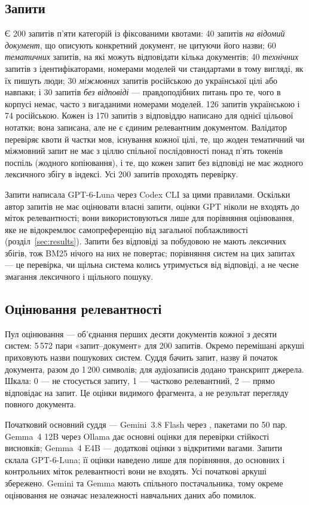 \subsection{Запити}
Є 200 запитів п'яти категорій із фіксованими квотами: 40 запитів \emph{на відомий документ}, що описують конкретний документ, не цитуючи його назви; 60 \emph{тематичних} запитів, на які можуть відповідати кілька документів; 40 \emph{технічних} запитів з ідентифікаторами, номерами моделей чи стандартами в тому вигляді, як їх пишуть люди; 30 \emph{міжмовних} запитів російською до української цілі або навпаки; і 30 запитів \emph{без відповіді} --- правдоподібних питань про те, чого в корпусі немає, часто з вигаданими номерами моделей. 126 запитів українською і 74 російською. Кожен із 170 запитів з відповіддю написано для однієї цільової нотатки; вона записана, але не є єдиним релевантним документом. Валідатор перевіряє квоти й частки мов, існування кожної цілі, те, що жоден тематичний чи міжмовний запит не має з ціллю спільної послідовності понад п'ять токенів поспіль (жодного копіювання), і те, що кожен запит без відповіді не має жодного лексичного збігу в індексі. Усі 200 запитів проходять перевірку.

Запити написала GPT-6-Luna через Codex CLI за цими правилами. Оскільки автор запитів не має оцінювати власні запити, оцінки GPT ніколи не входять до міток релевантності; вони використовуються лише для порівняння оцінювання, яке не відокремлює самопреференцію від загальної поблажливості (розділ~\ref{sec:results}). Запити без відповіді за побудовою не мають лексичних збігів, тож BM25 нічого на них не повертає; порівняння систем на цих запитах --- це перевірка, чи щільна система колись утримується від відповіді, а не чесне змагання лексичного і щільного пошуку.

\subsection{Оцінювання релевантності}
Пул оцінювання — об'єднання перших десяти документів кожної з десяти систем: 5\,572 пари «запит--документ» для 200 запитів. Окремо перемішані аркуші приховують назви пошукових систем. Суддя бачить запит, назву й початок документа, разом до 1\,200 символів; для аудіозаписів додано транскрипт джерела. Шкала: 0 — не стосується запиту, 1 — частково релевантний, 2 — прямо відповідає на запит. Це оцінки видимого фрагмента, а не результат перегляду повного документа.

Початковий основний суддя — Gemini~3.8 Flash через , пакетами по 50 пар. Gemma~4 12B через Ollama дає основні оцінки для перевірки стійкості висновків; Gemma~4 E4B — додаткові оцінки з відкритими вагами. Запити склала GPT-6-Luna; її оцінки наведено лише для порівняння, до основних і контрольних міток релевантності вони не входять. Усі початкові аркуші збережено. Gemini та Gemma мають спільного постачальника, тому окреме оцінювання не означає незалежності навчальних даних або помилок.

